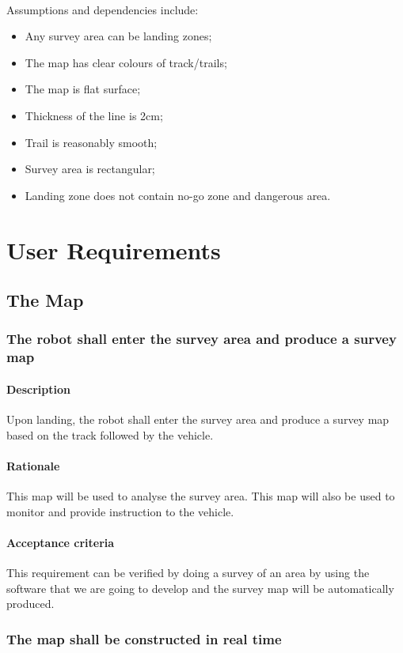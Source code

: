\documentclass[10pt,a4paper,titlepage]{article}
\begin{document}
	\paragraph{}
Assumptions and dependencies include: 
	\begin{itemize}
	\item Any survey area can be landing zones;
	\item The map has clear colours of track/trails;
	\item The map is flat surface;
	\item Thickness of the line is 2cm;
	\item Trail is reasonably smooth;
	\item Survey area is rectangular;
	\item Landing zone does not contain no-go zone and dangerous area.
	\end{itemize}

	\section{User Requirements}
	\subsection{The Map}
    \subsubsection{The robot shall enter the survey area and produce a survey map}
    \paragraph{Description}   Upon landing, the robot shall enter the survey area and produce a survey map based on the track followed by the vehicle.
    \paragraph{Rationale}   This map will be used to analyse the survey area. This map will also be used to monitor and provide instruction to the vehicle.
    \paragraph{Acceptance criteria}   This requirement can be verified by doing a survey of an area  by using the software that we are going to develop and the survey map will be automatically produced.
    \subsubsection{The map shall be constructed in real time}
\end{document}
